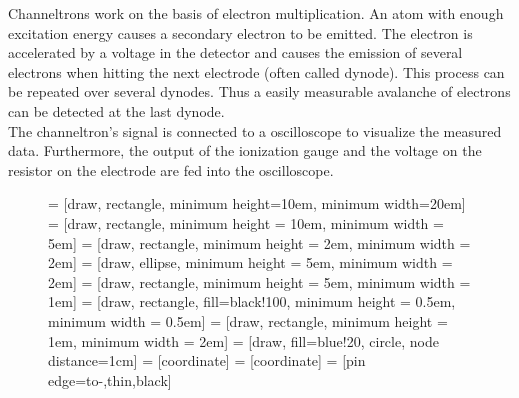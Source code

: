 \documentclass[a4paper,10pt]{article}
\begin{document}
Channeltrons work on the basis of electron multiplication. An atom with enough excitation energy causes a secondary electron to be emitted. The electron is accelerated by a voltage in the detector and causes the emission of several electrons when hitting the next electrode (often called dynode). This process can be repeated over several dynodes. Thus a easily measurable avalanche of electrons can be detected at the last dynode.
\\
The channeltron's signal is connected to a oscilloscope to visualize the measured data. Furthermore, the output of the ionization gauge and the voltage on the resistor on the electrode are fed into the oscilloscope.
\begin{figure}[H]
    \centering
     = [draw, rectangle,
    minimum height=10em, minimum width=20em]
     = [draw, rectangle, minimum height = 10em, minimum width = 5em]
     = [draw, rectangle, minimum height = 2em, minimum width = 2em]
     = [draw, ellipse, minimum height = 5em, minimum width = 2em]
     = [draw, rectangle, minimum height = 5em, minimum width = 1em]
     = [draw, rectangle, fill=black!100, minimum height = 0.5em, minimum width = 0.5em]
     = [draw, rectangle, minimum height = 1em, minimum width = 2em]
     = [draw, fill=blue!20, circle, node distance=1cm]
     = [coordinate]
     = [coordinate]
     = [pin edge={to-,thin,black}]

\end{figure}
\end{document}
